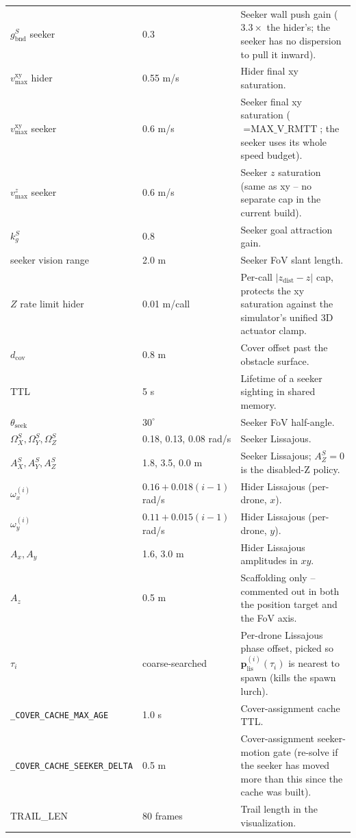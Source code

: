 \documentclass[11pt,a4paper]{article}
\newcommand{\code}[1]{\texttt{#1}}
\newcommand{\vect}[1]{\mathbf{#1}}
\begin{document}
\begin{longtable}{p{4.5cm}p{2.2cm}p{8cm}}
$g_\mathrm{bnd}^S$ seeker & 0.3 & Seeker wall push gain ($3.3\times$ the
hider's; the seeker has no dispersion to pull it inward). \\
$v_\mathrm{max}^\mathrm{xy}$ hider & 0.55 m/s & Hider final xy saturation. \\
$v_\mathrm{max}^\mathrm{xy}$ seeker & 0.6 m/s & Seeker final xy saturation
($= \text{MAX\_V\_RMTT}$; the seeker uses its whole speed budget). \\
$v_\mathrm{max}^z$ seeker & 0.6 m/s & Seeker $z$ saturation (same as xy --
no separate cap in the current build). \\
$k_g^S$ & 0.8 & Seeker goal attraction gain. \\
seeker vision range & 2.0 m & Seeker FoV slant length. \\
$Z$ rate limit hider & 0.01 m/call & Per-call $|z_\mathrm{dist} - z|$ cap,
protects the xy saturation against the simulator's unified 3D actuator clamp. \\
$d_\mathrm{cov}$ & 0.8 m & Cover offset past the obstacle surface. \\
TTL & 5 s & Lifetime of a seeker sighting in shared memory. \\
$\theta_\mathrm{seek}$ & $30^\circ$ & Seeker FoV half-angle. \\
$\Omega_X^S, \Omega_Y^S, \Omega_Z^S$ & 0.18, 0.13, 0.08 rad/s & Seeker Lissajous. \\
$A_X^S, A_Y^S, A_Z^S$ & 1.8, 3.5, 0.0 m & Seeker Lissajous; $A_Z^S = 0$ is
the disabled-Z policy. \\
$\omega_x^{(i)}$ & $0.16 + 0.018(i-1)$ rad/s & Hider Lissajous (per-drone, $x$). \\
$\omega_y^{(i)}$ & $0.11 + 0.015(i-1)$ rad/s & Hider Lissajous (per-drone, $y$). \\
$A_x, A_y$ & 1.6, 3.0 m & Hider Lissajous amplitudes in $xy$. \\
$A_z$ & 0.5 m & Scaffolding only -- commented out in both the position
target and the FoV axis. \\
$\tau_i$ & coarse-searched & Per-drone Lissajous phase offset, picked so
$\vect{p}_\mathrm{lis}^{(i)}(\tau_i)$ is nearest to spawn (kills the spawn
lurch). \\
\code{\_COVER\_CACHE\_MAX\_AGE} & 1.0 s & Cover-assignment cache TTL. \\
\code{\_COVER\_CACHE\_SEEKER\_DELTA} & 0.5 m & Cover-assignment seeker-motion
gate (re-solve if the seeker has moved more than this since the cache was built). \\
TRAIL\_LEN & 80 frames & Trail length in the visualization. \\
\bottomrule
\end{longtable}
\end{document}
